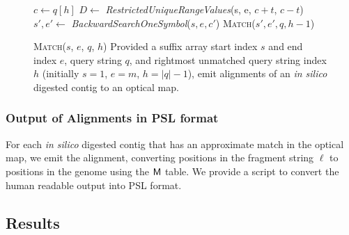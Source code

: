 \renewcommand{\algorithmiccomment}[1]{\hskip0em$\triangleright$ #1}
\begin{figure}
\begin{algorithmic}

\State {}
\Else
\State {}
\State $c \leftarrow q[h]$
\State {}
\State $D \leftarrow$ \emph{RestrictedUniqueRangeValues}(s, e, $c + t$, $c - t$)
\State {}
\State {}
\State {}
\State $s', e' \leftarrow$ \emph{BackwardSearchOneSymbol}($s,e,c'$)
\State {}
\State \textsc{Match}($s', e', q, h - 1$)
\EndIf
\EndFor
\EndIf
\EndProcedure
\end{algorithmic}


\caption{\textsc{Match}($s$, $e$, $q$, $h$) Provided a suffix array start index $s$ and end index $e$, query string $q$, and rightmost unmatched query string index $h$ (initially $s=1$, $e=m$, $h=|q| - 1$), emit alignments of an \emph{in silico} digested contig to an optical map.}
\label{match}

\end{figure}


\subsubsection{Output of Alignments in PSL format}
For each \emph{in silico} digested contig that has an approximate match in the optical map, we emit the alignment, converting positions in the fragment string $\ell$ to positions in the genome using the $\mbox{\rm {\sf M}}$ table. We provide a script to convert the human readable output into PSL format.
\subsection{Results}
\label{sec-results-twin}

